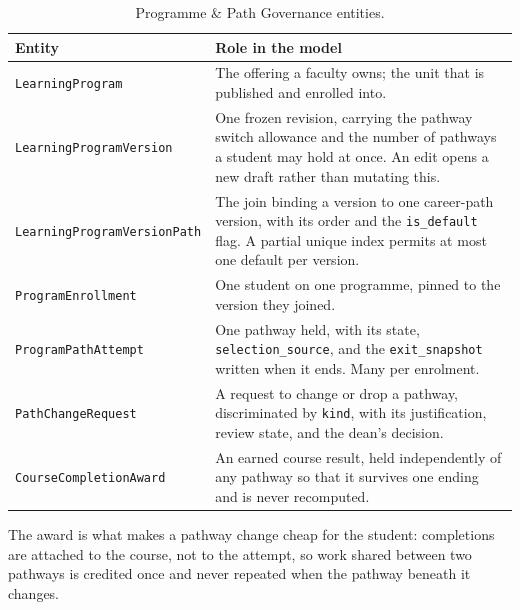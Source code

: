\begin{table}[H]
\centering
\renewcommand{\arraystretch}{1.25}
\small
\begin{tabular}{|>{\raggedright\arraybackslash}m{}|>{\raggedright\arraybackslash}m{}|}
\hline
\textbf{Entity} & \textbf{Role in the model} \\ \hline
\texttt{LearningProgram} & The offering a faculty owns; the unit that is published and enrolled into. \\ \hline
\texttt{LearningProgramVersion} & One frozen revision, carrying the pathway switch allowance and the number of pathways a student may hold at once. An edit opens a new draft rather than mutating this. \\ \hline
\texttt{LearningProgramVersionPath} & The join binding a version to one career-path version, with its order and the \texttt{is\_default} flag. A partial unique index permits at most one default per version. \\ \hline
\texttt{ProgramEnrollment} & One student on one programme, pinned to the version they joined. \\ \hline
\texttt{ProgramPathAttempt} & One pathway held, with its state, \texttt{selection\_source}, and the \texttt{exit\_snapshot} written when it ends. Many per enrolment. \\ \hline
\texttt{PathChangeRequest} & A request to change or drop a pathway, discriminated by \texttt{kind}, with its justification, review state, and the dean's decision. \\ \hline
\texttt{CourseCompletionAward} & An earned course result, held independently of any pathway so that it survives one ending and is never recomputed. \\ \hline
\end{tabular}
\caption{Programme \& Path Governance entities.}
\label{tab:class_programme}
\end{table}

\noindent The award is what makes a pathway change cheap for the student: completions are attached to the course, not to the attempt, so work shared between two pathways is credited once and never repeated when the pathway beneath it changes.

